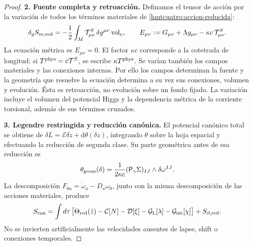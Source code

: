\begin{proof}
\par\medskip\noindent\textbf{2. Fuente completa y retroacción.}\quad
Definamos el tensor de acción por la variación de todos los términos
materiales de \eqref{hmtcuatro:accion-reducida}:
\begin{equation}
 \delta_g S_{m,\rm red}=-\frac12\int_M
       \mathcal T^S_{\mu\nu}\,\delta g^{\mu\nu}\operatorname{vol}_e,
 \qquad
 E_{\mu\nu}:=G_{\mu\nu}+\Lambda g_{\mu\nu}
                   -\kappa c\,\mathcal T^S_{\mu\nu}.
 \label{hmtcuatro:fuente-completa}
\end{equation}
La ecuación métrica es \(E_{\mu\nu}=0\).
El factor \(\kappa c\) corresponde a la cotetrada de longitud;
si \(T^{\rm phys}=c\mathcal T^S\), se escribe \(\kappa T^{\rm phys}\).
Se varían también los campos materiales y las conexiones internas.
Por ello los campos determinan la fuente y la geometría que resuelve
la ecuación determina a su vez sus conexiones, volumen y evolución.
Ésta es retroacción, no evolución sobre un fondo fijado.
La variación incluye el volumen del potencial Higgs y la dependencia
métrica de la corriente torsional, además de sus términos cruzados.

\par\medskip\noindent\textbf{3. Legendre restringida y reducción canónica.}\quad
El potencial canónico total se obtiene de
\(\delta L=\mathcal E\delta z+\mathrm d\theta(\delta z)\),
integrando \(\theta\) sobre la hoja espacial y efectuando la reducción
de segunda clase. Su parte geométrica antes de esa reducción es
\[
 \theta_{\rm geom}(\delta)=
   \frac1{2\kappa c}(\mathsf P_\gamma\Sigma)_{IJ}
                       \wedge\delta\omega^{IJ}.
\]
La descomposición \(F_{0a}=\dot\omega_a-D_a\omega_0\), junto con la
misma descomposición de las acciones materiales, produce
\begin{equation}
 S_{\rm can}=\int d\tau\,
 \bigl[\Theta_{\rm red}(\dot z)-\mathcal C[N]-\mathcal D[\xi]
       -\mathcal G_{\rm L}[\lambda]-\mathcal G_{\rm int}[\chi]\bigr]
       +S_{\partial,\rm red}.
 \label{hmtcuatro:legendre-total}
\end{equation}
No se invierten artificialmente las velocidades ausentes de lapse,
shift o conexiones temporales.


\end{proof}
